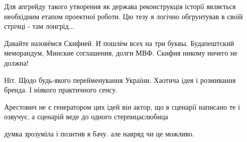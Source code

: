 \begin{itemize}
Для апгрейду такого утворення як держава реконструкція історії являється
необхідним етапом проектної роботи. Цю тезу я логічно обгрунтував в своїй
стрічці - там лонгрід...


 
Давайте назовёмся Скифией.
И пошлём всех на три буквы. Будапештский меморандум, Минские соглашения, долги МВФ.
Скифия никому ничего не должна!

 

Ніт. Щодо будь-якого перейменування України. Хаотича ідея і розмивання бренда.
І ніякого практичного сенсу.


 

Арестович не є генератором цих ідей він актор, що в сценарії написано те і
озвучує, а сценарій веде до одного стерпицаслюбица


 

думка зрозуміла і позитив я бачу.
але навряд чи це можливо.

 


\end{itemize}
